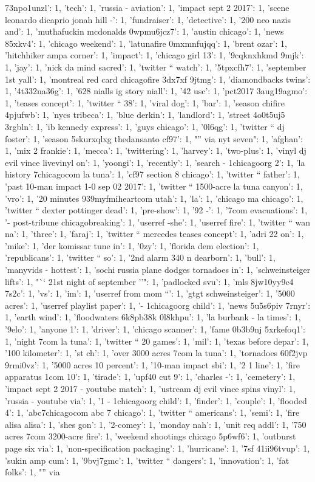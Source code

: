 \documentclass[letterpaper,twocolumn,10pt]{article}
\begin{document}
73npo1unzl': 1, 'tech': 1, 'russia - aviation': 1, 'impact sept 2 2017': 1, 'scene leonardo dicaprio jonah hill -': 1, 'fundraiser': 1, 'detective': 1, '200 neo nazis and': 1, 'muthafuckin mcdonalds 0wpmu6jcz7': 1, 'austin chicago': 1, 'news 85xkv4': 1, 'chicago weekend': 1, 'latunafire 0mxmnfujqq': 1, 'brent ozar': 1, 'hitchhiker ampa corner': 1, 'impact': 1, 'chicago girl 13': 1, '9cqknxhkmd 9mjk': 1, 'jay': 1, 'nick da mind sacred': 1, 'twitter `` watch': 1, '5tpxcfh7': 1, 'september 1st yall': 1, 'montreal red card chicagofire 3dx7xf 9jtmg': 1, 'diamondbacks twins': 1, '4t332na36g': 1, '628 nialls ig story niall': 1, '42 usc': 1, 'pct2017 3aug19agmo': 1, 'teases concept': 1, 'twitter `` 38': 1, 'viral dog': 1, 'bar': 1, 'season chifire 4pjufwb': 1, 'nycs tribeca': 1, 'blue derkin': 1, 'landlord': 1, 'street 4o0t5uj5 3rgbln': 1, 'ib kennedy express': 1, 'guys chicago': 1, '0l6qg': 1, 'twitter `` dj foster': 1, 'season 5skurxqlxg thedansanto cf97': 1, "'' via nyt seven": 1, 'afghan': 1, 'mix 2 frankie': 1, 'mecca': 1, 'twittering': 1, 'harvey': 1, 'two-plus': 1, 'vinyl dj evil vince livevinyl on': 1, 'yoongi': 1, 'recently': 1, 'search - 1chicagoorg 2': 1, 'la history 7chicagocom la tuna': 1, 'cf97 section 8 chicago': 1, 'twitter `` father': 1, 'past 10-man impact 1-0 sep 02 2017': 1, 'twitter `` 1500-acre la tuna canyon': 1, 'vro': 1, '20 minutes 939myfmiheartcom utah': 1, 'la': 1, 'chicago ma chicago': 1, 'twitter `` dexter pottinger dead': 1, 'pre-show': 1, '92 -': 1, '7com evacuations': 1, '- post-tribune chicagobreaking': 1, 'userref -she': 1, 'userref fire': 1, 'twitter `` wan na': 1, 'three': 1, 'faraj': 1, 'twitter `` mercedes teases concept': 1, 'adri 22 on': 1, 'mike': 1, 'der komissar tune in': 1, '0zy': 1, 'florida dem election': 1, 'republicans': 1, 'twitter `` so': 1, '2nd alarm 340 n dearborn': 1, 'bull': 1, 'manyvids - hottest': 1, 'sochi russia plane dodges tornadoes in': 1, 'schweinsteiger lifts': 1, "`` 21st night of september ''": 1, 'padlocked svu': 1, 'mls 8jw10yy9c4 7s2c': 1, 'vs': 1, 'im': 1, 'userref from mom ``': 1, 'gtgt schweinsteiger': 1, '5000 acres': 1, 'userref playlist paper': 1, '- 1chicagoorg child': 1, 'news 5u5s6piv 7rnyr': 1, 'earth wind': 1, 'floodwaters 6k8pb38k 0l8khpu': 1, 'la burbank - la times': 1, '9elo': 1, 'anyone 1': 1, 'driver': 1, 'chicago scanner': 1, 'fame 0b3b9nj 5xrkefoq1': 1, 'night 7com la tuna': 1, 'twitter `` 20 games': 1, 'mil': 1, 'texas before depar': 1, '100 kilometer': 1, 'st ch': 1, 'over 3000 acres 7com la tuna': 1, 'tornadoes 60f2jvp 9rmi0vz': 1, '5000 acres 10 percent': 1, '10-man impact sbi': 1, '2 1 line': 1, 'fire apparatus 1com 10': 1, 'tirade': 1, 'upf40 cut 9': 1, 'charles -': 1, 'cemetery': 1, 'impact sept 2 2017 - youtube match': 1, 'ustream dj evil vince spins vinyl': 1, 'russia - youtube via': 1, '1 - 1chicagoorg child': 1, 'finder': 1, 'couple': 1, 'flooded 4': 1, 'abc7chicagocom abc 7 chicago': 1, 'twitter `` americans': 1, 'semi': 1, 'fire alisa alisa': 1, 'shes gon': 1, '2-comey': 1, 'monday nah': 1, 'unit req addl': 1, '750 acres 7com 3200-acre fire': 1, 'weekend shootings chicago 5p6wf6': 1, 'outburst page six via': 1, 'non-specification packaging': 1, 'hurricane': 1, '7sf 41ii96tvup': 1, 'sukin amp cum': 1, '9bvj7gmc': 1, 'twitter `` dangers': 1, 'innovation': 1, 'fat folks': 1, "'' via 
\end{document}
